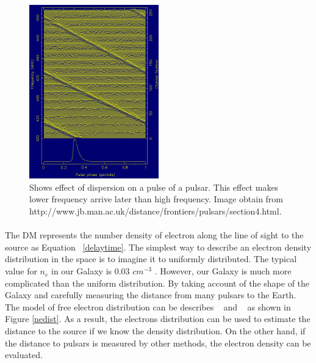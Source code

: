 \documentclass[thesis_msc.tex]{subfiles}
\begin{document}
\begin{figure}[h] \centering
\includegraphics[width=0.5\textwidth]{figures/disp.png}
\caption{Shows effect of dispersion on a pulse of a pulsar. This effect makes lower frequency arrive later than high frequency. Image obtain from http://www.jb.man.ac.uk/distance/frontiers/pulsars/section4.html.  }
\label{DMplot}
\end{figure}
   \paragraph{} The DM represents the number density of electron along the line of sight to the source as Equation ~\ref{delaytime}. The simplest way to describe an electron density distribution in the space is to imagine it to uniformly distributed. The typical value for $n_e$ in our Galaxy is 0.03 $cm^{-3}$ \citep{ables1976hydrogen}. However, our Galaxy is much more complicated than the uniform distribution. By taking account of the shape of the Galaxy and carefully measuring the distance from many pulsars to the Earth. The model of free electron distribution can be describes ~\citep{cordes2003ne2001} and ~\citep{yao2017new} as shown in Figure \ref{nedist}.  As a result, the electrons distribution can be used to estimate the distance to the source if we know the density distribution. On the other hand, if the distance to pulsars is measured by other methods, the electron density can be evaluated. 
   
\end{document}
